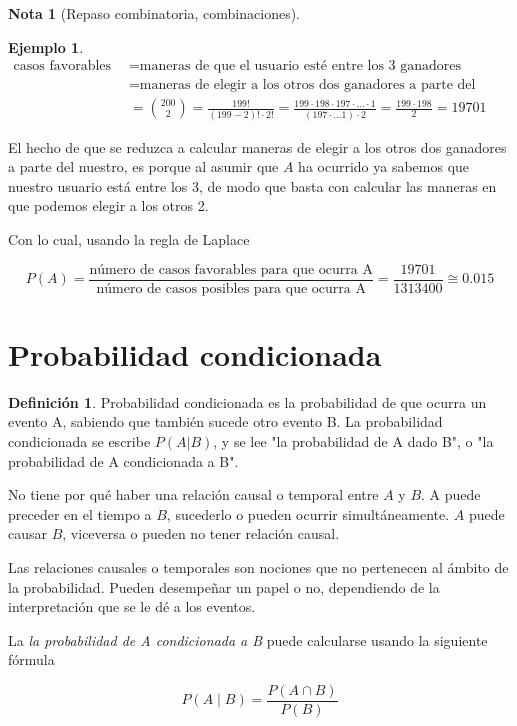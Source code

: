 \documentclass[]{book}
\theoremstyle{plain}
\theoremstyle{definition}
\newtheorem{definition}[theorem]{Definición}
\newtheorem{note}[theorem]{Nota}
\newtheorem{example}[theorem]{Ejemplo}
\theoremstyle{definition} %
\begin{document}
\begin{note}[Repaso combinatoria, combinaciones]
\begin{example}
\begin{align*}
  \text{casos favorables para A}&= \text{maneras de que el usuario esté entre los 3 ganadores}\\
  &= \text{maneras de elegir a los otros dos ganadores a parte del nuestro}\\
  &={200 \choose 2} = \frac{199!}{(199-2)! \cdot 2!} = \frac{199 \cdot 198 \cdot 197\cdot\ldots\cdot 1 }{(197 \cdot \ldots 1)\cdot 2} = \frac{199 \cdot 198}{2}= 19701
\end{align*}

El hecho de que se reduzca a calcular maneras de elegir a los otros dos ganadores a parte del nuestro, es porque al asumir que $A$ ha ocurrido ya sabemos que nuestro usuario
está entre los 3, de modo que basta con calcular las maneras en que podemos elegir a los otros 2.

Con lo cual, usando la regla de Laplace

\[P(A) = \frac{\text{número de casos favorables para que ocurra A}}{\text{número de casos posibles para que ocurra A}} = \frac{19701}{1313400}\cong 0.015\]

\end{example}

\end{note}


\section{Probabilidad condicionada}

\begin{definition}
  
Probabilidad condicionada es la probabilidad de que ocurra un evento A, sabiendo que también sucede otro evento B. 
La probabilidad condicionada se escribe $P(A|B)$, y se lee "la probabilidad de A dado B", o "la probabilidad de A condicionada a B".

No tiene por qué haber una relación causal o temporal entre $A$ y $B$. A puede preceder en el tiempo a $B$, 
sucederlo o pueden ocurrir simultáneamente. $A$ puede causar $B$, viceversa o pueden no tener relación causal. 

Las relaciones causales o temporales son nociones que no pertenecen al ámbito de la probabilidad. 
Pueden desempeñar un papel o no, dependiendo de la interpretación que se le dé a los eventos. 

La \emph{la probabilidad de A condicionada a B} puede calcularse usando la siguiente fórmula 

\begin{equation}\label{equ_condicionada}
  P(A\mid B)=\frac {P(A\cap B)}{P(B)} 
\end{equation}


\end{definition}
\end{document}
